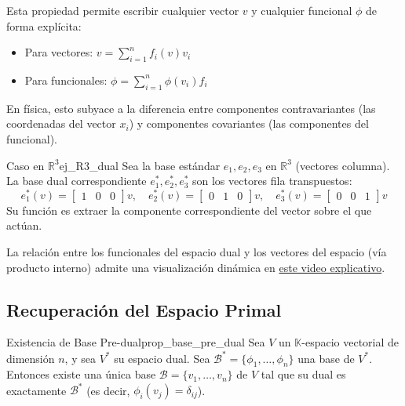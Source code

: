 \documentclass[11pt, a4paper]{article}
\begin{document}
Esta propiedad permite escribir cualquier vector $v$ y cualquier funcional $\phi$ de forma explícita:

\begin{itemize}
    \item Para vectores: $v = \sum_{i=1}^n f_i(v) v_i$
    \item Para funcionales: $\phi = \sum_{i=1}^n \phi(v_i) f_i$
\end{itemize}

\obs
En física, esto subyace a la diferencia entre componentes contravariantes (las coordenadas del vector $x_i$) y componentes covariantes (las componentes del funcional).

\begin{ejemplo}{Caso en $\mathbb{R}^3$}{ej_R3_dual}
Sea la base estándar $e_1, e_2, e_3$ en $\mathbb{R}^3$ (vectores columna). La base dual correspondiente $e^*_1, e^*_2, e^*_3$ son los vectores fila transpuestos:
\[
e^*_1(v) = \begin{bmatrix} 1 & 0 & 0 \end{bmatrix} v, \quad 
e^*_2(v) = \begin{bmatrix} 0 & 1 & 0 \end{bmatrix} v, \quad 
e^*_3(v) = \begin{bmatrix} 0 & 0 & 1 \end{bmatrix} v
\]
Su función es extraer la componente correspondiente del vector sobre el que actúan.
\end{ejemplo}

La relación entre los funcionales del espacio dual y los vectores del espacio (vía producto interno) admite una visualización dinámica en \href{https://www.youtube.com/watch?v=LyGKycYT2v0}{este video explicativo}.

\subsection{Recuperación del Espacio Primal}

\begin{proposicion}{Existencia de Base Pre-dual}{prop_base_pre_dual}
Sea $V$ un $\mathbb{K}$-espacio vectorial de dimensión $n$, y sea $V^*$ su espacio dual. 
Sea $\mathcal{B}^* = \{\phi_1, \dots, \phi_n\}$ una base de $V^*$. 
Entonces existe una única base $\mathcal{B} = \{v_1, \dots, v_n\}$ de $V$ tal que su dual es exactamente $\mathcal{B}^*$ (es decir, $\phi_i(v_j) = \delta_{ij}$).
\end{proposicion}
\end{document}
